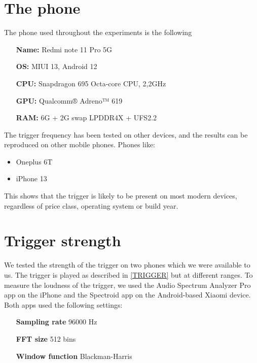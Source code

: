 \documentclass{report}
\theoremstyle{definition}
\theoremstyle{remark}
\begin{document}
\section{The phone}
The phone used throughout the experiments is the following \cite{REDMI}
\begin{center}
    \begin{varwidth}{\textwidth}
        \begin{itemize}
            \item[\textbf{Name:}] Redmi note 11 Pro 5G
            \item[\textbf{OS:}] MIUI 13, Android 12
            \item[\textbf{CPU:}] Snapdragon 695 Octa-core CPU, 2,2GHz
            \item[\textbf{GPU:}] Qualcomm® Adreno™ 619
            \item[\textbf{RAM:}] 6G + 2G swap LPDDR4X + UFS2.2
        \end{itemize}
    \end{varwidth}
\end{center}

The trigger frequency has been tested on other devices, and the results can be reproduced on other mobile phones. Phones like: 
\begin{itemize}
    \item Oneplus 6T
    \item iPhone 13
\end{itemize}

This shows that the trigger is likely to be present on most modern devices, regardless of price class, operating system or build year.

\section{Trigger strength}
We tested the strength of the trigger on two phones which we were available to us. The trigger is played as described in \autoref{TRIGGER} but at different ranges. To measure the loudness of the trigger, we used the Audio Spectrum Analyzer Pro \cite{AudioSpectrum} app on the iPhone and the Spectroid\cite{Spectroid} app on the Android-based Xiaomi device. Both apps used the following settings:

    \begin{center}
        \begin{varwidth}{\linewidth}
        \centering
            \begin{itemize}[itemindent=6em]
                \item[\textbf{Sampling rate}] 96000 Hz
                \item[\textbf{FFT size}] 512 bins
                \item[\textbf{Window function}] Blackman-Harris
            \end{itemize}
        \end{varwidth}
    \end{center}
\end{document}
